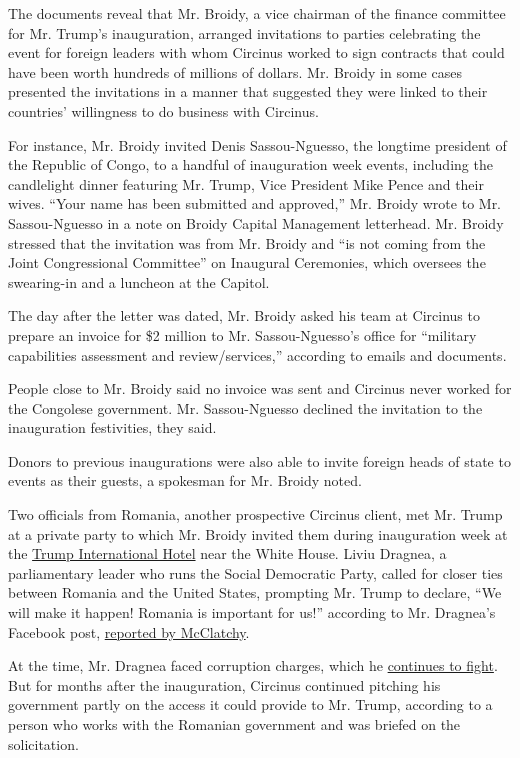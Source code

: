The documents reveal that Mr. Broidy, a vice chairman of the finance
committee for Mr. Trump's inauguration, arranged invitations to parties
celebrating the event for foreign leaders with whom Circinus worked to
sign contracts that could have been worth hundreds of millions of
dollars. Mr. Broidy in some cases presented the invitations in a manner
that suggested they were linked to their countries' willingness to do
business with Circinus.

For instance, Mr. Broidy invited Denis Sassou-Nguesso, the longtime
president of the Republic of Congo, to a handful of inauguration week
events, including the candlelight dinner featuring Mr. Trump, Vice
President Mike Pence and their wives. ``Your name has been submitted and
approved,'' Mr. Broidy wrote to Mr. Sassou-Nguesso in a note on Broidy
Capital Management letterhead. Mr. Broidy stressed that the invitation
was from Mr. Broidy and ``is not coming from the Joint Congressional
Committee'' on Inaugural Ceremonies, which oversees the swearing-in and
a luncheon at the Capitol.

The day after the letter was dated, Mr. Broidy asked his team at
Circinus to prepare an invoice for \$2 million to Mr. Sassou-Nguesso's
office for ``military capabilities assessment and review/services,''
according to emails and documents.

People close to Mr. Broidy said no invoice was sent and Circinus never
worked for the Congolese government. Mr. Sassou-Nguesso declined the
invitation to the inauguration festivities, they said.

Donors to previous inaugurations were also able to invite foreign heads
of state to events as their guests, a spokesman for Mr. Broidy noted.

Two officials from Romania, another prospective Circinus client, met Mr.
Trump at a private party to which Mr. Broidy invited them during
inauguration week at the
\href{https://www.nytimes.com/2017/08/25/us/politics/trump-hotel-washington.html}{Trump
International Hotel} near the White House. Liviu Dragnea, a
parliamentary leader who runs the Social Democratic Party, called for
closer ties between Romania and the United States, prompting Mr. Trump
to declare, ``We will make it happen! Romania is important for us!''
according to Mr. Dragnea's Facebook post,
\href{http://www.mcclatchydc.com/news/politics-government/article198952434.html}{reported
by McClatchy}.

At the time, Mr. Dragnea faced corruption charges, which he
\href{https://actmedia.eu/daily/speaker-of-the-chamber-of-deputies-liviu-dragnea-before-the-high-court-of-cassation-and-justice-under-the-accusation-of-abuse-of-office/74617}{continues
to fight}. But for months after the inauguration, Circinus continued
pitching his government partly on the access it could provide to Mr.
Trump, according to a person who works with the Romanian government and
was briefed on the solicitation.

